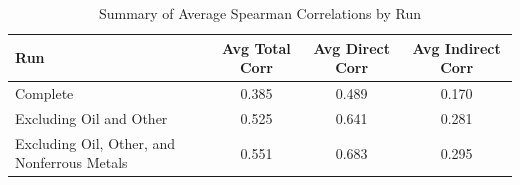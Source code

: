 \begin{table}[h]
\centering
\begin{tabular}{lccc}
\toprule
\textbf{Run} & \textbf{Avg Total Corr} & \textbf{Avg Direct Corr} & \textbf{Avg Indirect Corr} \\
\midrule
Complete & 0.385 & 0.489 & 0.170 \\
Excluding Oil and Other & 0.525 & 0.641 & 0.281 \\
Excluding Oil, Other, and Nonferrous Metals & 0.551 & 0.683 & 0.295 \\
\bottomrule
\end{tabular}
\caption{Summary of Average Spearman Correlations by Run}
\end{table}